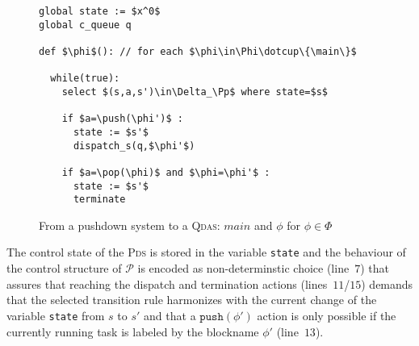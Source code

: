 \documentclass[runningheads,oribibl,]{article}
\newcommand{\Aa}{\ensuremath{\mathcal{A}}\xspace}
\newcommand{\Pp}{\ensuremath{\mathcal{P}}\xspace}
\newcommand{\cfont}[1]{\ensuremath{\mathtt{#1}}\xspace}
\DeclareMathOperator{\dotcup}{\mathaccent\cdot\cup}
\newcommand{\main}{\ensuremath{\textit{main}}\xspace}
\newcommand{\pds}{\textsc{Pds}\xspace}
\newcommand{\qdas}{\textsc{Qdas}\xspace}
\DeclareMathOperator{\Reach}{\textit{Reach}}
\newcommand{\ctg}{\ensuremath{\textsc{Ctg}}\xspace}
\newcommand{\push}{\ensuremath{\cfont{push}}}
\newcommand{\pop}{\ensuremath{\cfont{pop}}}
\begin{document}
\begin{figure}[t!]
  \centering
  \begin{minipage}{0.5\linewidth}
      \begin{lstlisting}
global state := $x^0$
global c_queue q

def $\phi$(): // for each $\phi\in\Phi\dotcup\{\main\}$

  while(true):
    select $(s,a,s')\in\Delta_\Pp$ where state=$s$

    if $a=\push(\phi')$ :
      state := $s'$
      dispatch_s(q,$\phi'$)

    if $a=\pop(\phi)$ and $\phi=\phi'$ :
      state := $s'$
      terminate
      \end{lstlisting}
    \end{minipage}
 \begin{minipage}[t]{0.5\linewidth}
\end{minipage}

    \caption{From a pushdown system  to a \qdas: \main and
    $\phi$ for $\phi\in\Phi$ \label{fig:sim_pds}}
    \vspace{-4ex}
\end{figure}


The control state of the \pds is stored in the variable \texttt{state} and
the behaviour of the control structure of \Pp is encoded as non-determinstic
choice (line~$7$) that assures that reaching the dispatch and termination actions
(lines~$11$/$15$) demands that the selected transition rule harmonizes with the
current change of the variable \texttt{state} from $s$ to $s'$ and that a
$\push(\phi')$ action is only possible if the currently running task is labeled
by the blockname $\phi'$ (line~$13$).
\end{document}
